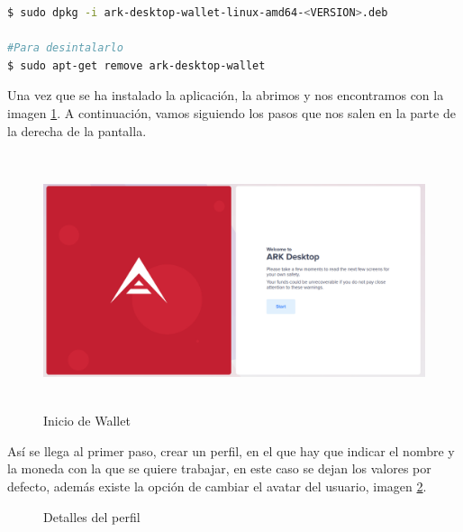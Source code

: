 \begin{lstlisting}[language=Bash,caption=Instalación de la aplicación ARK Wallet, label=cod:install-wallet, style=Consola]
$ sudo dpkg -i ark-desktop-wallet-linux-amd64-<VERSION>.deb

#Para desintalarlo
$ sudo apt-get remove ark-desktop-wallet
\end{lstlisting}


Una vez que se ha instalado la aplicación, la abrimos y nos encontramos con la imagen \ref{fig:wallet-1}. A continuación, vamos siguiendo los pasos que nos salen en la parte de la derecha de la pantalla.

\begin{figure}[H]
	\centering
	\includegraphics[width=13.5cm,height=7.5cm]{figuras/wallet_1.png}
	\caption{Inicio de Wallet}
	\label{fig:wallet-1}
\end{figure}

\newpage
Así se llega al primer paso, crear un perfil, en el que hay que indicar el nombre y la moneda con la que se quiere trabajar, en este caso se dejan los valores por defecto, además existe la opción de cambiar el avatar del usuario, imagen \ref{fig:wallet-2}.

\begin{figure}[H]
	\centering
	\caption{Detalles del perfil}
	\label{fig:wallet-2}
\end{figure}

